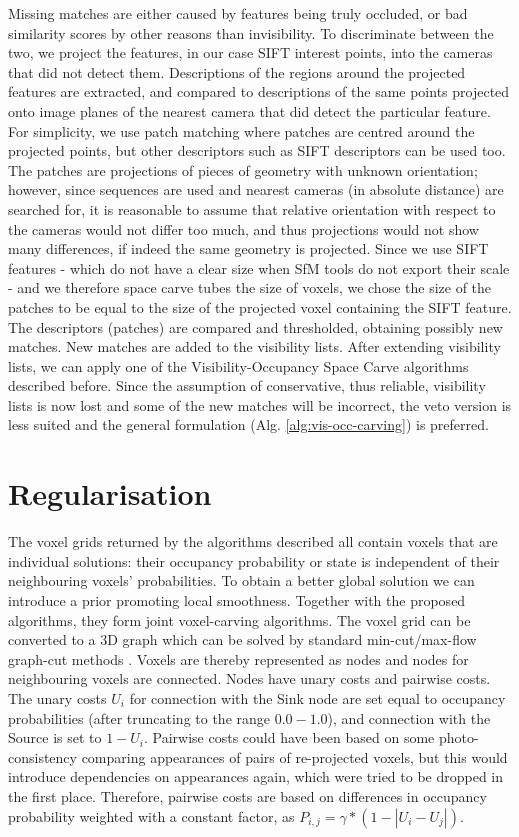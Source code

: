 Missing matches are either caused by features being truly occluded, or bad similarity scores by other reasons than invisibility. To discriminate between the two, we project the features, in our case SIFT interest points, into the cameras that did not detect them. Descriptions of the regions around the projected features are extracted, and compared to descriptions of the same points projected onto image planes of the nearest camera that did detect the particular feature. For simplicity, we use patch matching where patches are centred around the projected points, but other descriptors such as SIFT descriptors can be used too. The patches are projections of pieces of geometry with unknown orientation; however, since sequences are used and nearest cameras (in absolute distance) are searched for, it is reasonable to assume that relative orientation with respect to the cameras would not differ too much, and thus projections would not show many differences, if indeed the same geometry is projected. Since we use SIFT features - which do not have a clear size when SfM tools do not export their scale - and we therefore space carve tubes the size of voxels, we chose the size of the patches to be equal to the size of the projected voxel containing the SIFT feature. The descriptors (\ie patches) are compared and thresholded, obtaining possibly new matches. New matches are added to the visibility lists. After extending visibility lists, we can apply one of the Visibility-Occupancy Space Carve algorithms described before. Since the assumption of conservative, thus reliable, visibility lists is now lost and some of the new matches will be incorrect, the veto version is less suited and the general formulation (Alg. \ref{alg:vis-occ-carving}) is preferred.



\section{Regularisation}  \label{regularisation}
The voxel grids returned by the algorithms described all contain voxels that are individual solutions: their occupancy probability or state is independent of their neighbouring voxels' probabilities. To obtain a better global solution we can introduce a prior promoting local smoothness. Together with the proposed algorithms, they form joint voxel-carving algorithms. The voxel grid can be converted to a 3D graph which can be solved by standard min-cut/max-flow graph-cut methods \cite{Boykov2004}. Voxels are thereby represented as nodes and nodes for neighbouring voxels are connected. Nodes have unary costs and pairwise costs. The unary costs $U_i$ for connection with the Sink node are set equal to occupancy probabilities (after truncating to the range $0.0-1.0$), and connection with the Source is set to $1 - U_i$. Pairwise costs could have been based on some photo-consistency comparing appearances of pairs of re-projected voxels, but this would introduce dependencies on appearances again, which were tried to be dropped in the first place. Therefore, pairwise costs are based on differences in occupancy probability weighted with a constant factor, as $P_{i,j} = \gamma * (1 - | U_i - U_j |)$.

